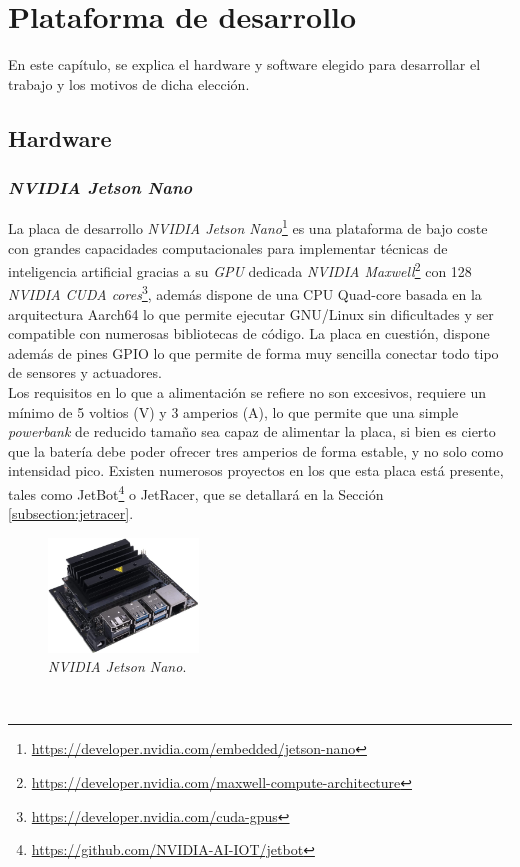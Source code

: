 \chapter{Plataforma de desarrollo}
\label{cap:capitulo3}

En este capítulo, se explica el hardware y software elegido para desarrollar el trabajo y los motivos de dicha elección.

\section{Hardware}
\subsection{\textit{NVIDIA Jetson Nano}}
\label{subsection:jetsonnano}
La placa de desarrollo \textit{NVIDIA Jetson Nano}\footnote{\url{https://developer.nvidia.com/embedded/jetson-nano}} es una plataforma de bajo coste con grandes capacidades computacionales para implementar técnicas de inteligencia artificial gracias a su \textit{GPU} dedicada \textit{NVIDIA Maxwell}\footnote{\url{https://developer.nvidia.com/maxwell-compute-architecture}} con 128 \textit{NVIDIA CUDA cores}\footnote{\url{https://developer.nvidia.com/cuda-gpus}}, además dispone de una CPU Quad-core basada en la arquitectura Aarch64 lo que permite ejecutar GNU/Linux sin dificultades y ser compatible con numerosas bibliotecas de código. La placa en cuestión, dispone además de pines GPIO lo que permite de forma muy sencilla conectar todo tipo de sensores y actuadores.\\

Los requisitos en lo que a alimentación se refiere no son excesivos, requiere un mínimo de 5 voltios (V) y 3 amperios (A), lo que permite que una simple \textit{powerbank} de reducido tamaño sea capaz de alimentar la placa, si bien es cierto que la batería debe poder ofrecer tres amperios de forma estable, y no solo como intensidad pico. Existen numerosos proyectos en los que esta placa está presente, tales como JetBot\footnote{\url{https://github.com/NVIDIA-AI-IOT/jetbot}} o JetRacer, que se detallará en la Sección \ref{subsection:jetracer}.\\

\begin{figure} [h!]
	\begin{center}
		\includegraphics[width=4cm]{figs/jetsonnano}
	\end{center}
	\caption{\textit{NVIDIA Jetson Nano}.}
	\label{fig:jetsonnano}
\end{figure}\

